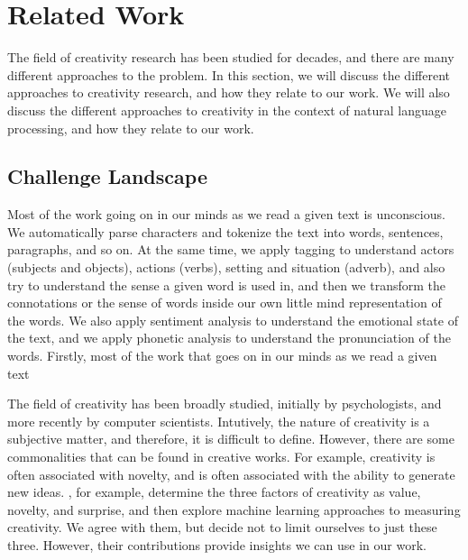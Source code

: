 \chapter{Related Work}
\label{chap:background}
The field of creativity research has been studied for decades, and there are many different approaches to the problem. In this section, we will discuss the different approaches to creativity research, and how they relate to our work. We will also discuss the different approaches to creativity in the context of natural language processing, and how they relate to our work.

\section{Challenge Landscape}
\label{sec:challenge_landscape}
Most of the work going on in our minds as we read a given text is unconscious. We automatically parse characters and tokenize the text into words, sentences, paragraphs, and so on. At the same time, we apply tagging to understand actors (subjects and objects), actions (verbs), setting and situation (adverb), and also try to understand the sense a given word is used in, and then we transform the connotations or the sense of words inside our own little mind representation of the words. We also apply sentiment analysis to understand the emotional state of the text, and we apply phonetic analysis to understand the pronunciation of the words. 
Firstly, most of the work that goes on in our minds as we read a given text 

The field of creativity has been broadly studied, initially by psychologists, and more recently by computer scientists. Intutively, the nature of creativity is a subjective matter, and therefore, it is difficult to define. However, there are some commonalities that can be found in creative works. For example, creativity is often associated with novelty, and is often associated with the ability to generate new ideas. \cite{franceschelli_deepcreativity_2022}, for example, determine the three factors of creativity as value, novelty, and surprise, and then explore machine learning approaches to measuring creativity. We agree with them, but decide not to limit ourselves to just these three. However, their contributions provide insights we can use in our work.  

